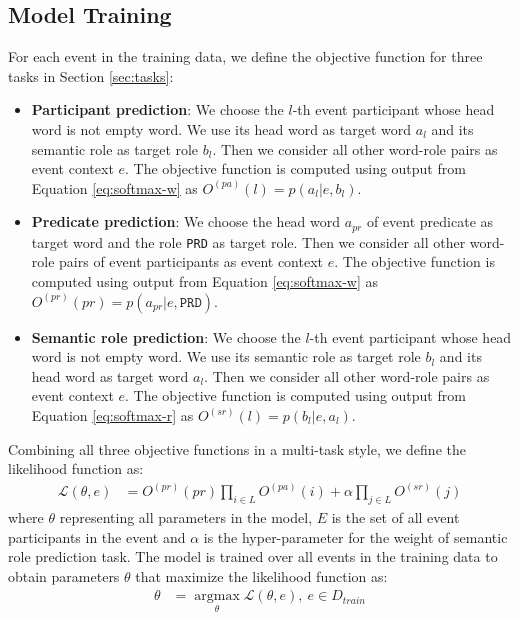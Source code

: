 \documentclass[a4paper]{article}
\begin{document}
\subsection{Model Training} \label{sec:training}
For each event in the training data, we define the objective function for three tasks in Section \ref{sec:tasks}:
\begin{itemize}
  \item  \textbf{Participant prediction}: We choose the $l$-th event participant whose head word is not empty word. We use its head word as target word $a_l$ and its semantic role as target role $b_l$. Then we consider all other word-role pairs as event context $e$. The objective function is computed using output from Equation \eqref{eq:softmax-w} as  $O^{(pa)}(l) = p(a_l | e, b_l)$. 
  \item  \textbf{Predicate prediction}: We choose the head word $a_{pr}$ of event predicate as target word and the role \texttt{PRD} as target role. Then we consider all other word-role pairs of event participants as event context $e$. The objective function is computed using output from Equation \eqref{eq:softmax-w} as  $O^{(pr)}(pr) = p(a_{pr} | e, \texttt{PRD})$. 
  \item  \textbf{Semantic role prediction}: We choose the $l$-th event participant whose head word is not empty word. We use its semantic role as target role $b_l$ and its head word as target word $a_l$. Then we consider all other word-role pairs as event context $e$. The objective function is computed using output from Equation \eqref{eq:softmax-r} as  $O^{(sr)}(l) = p(b_l | e, a_l)$. 
\end{itemize}
Combining all three objective functions in a multi-task style, we define the likelihood function as:
\begin{equation} \label{eq:likelihood}
\begin{aligned}
    \mathcal{L}(\theta, e)
        &= O^{(pr)}(pr) \prod_{i \in L} O^{(pa)}(i) + \alpha \prod_{j \in L} O^{(sr)}(j) 
\end{aligned}
\end{equation}
where $\theta$ representing all parameters in the model, $E$ is the set of all event participants in the event and $\alpha$ is the hyper-parameter for the weight of semantic role prediction task. The model is trained over all events in the training data to obtain parameters $\theta$ that maximize the likelihood function as:
\begin{equation} \label{eq:mle}
\begin{aligned}
    \theta
        &= \mathop{argmax} \limits_{\theta} \mathcal{L}(\theta, e),\ e \in D_{train}
\end{aligned}
\end{equation}
\end{document}
